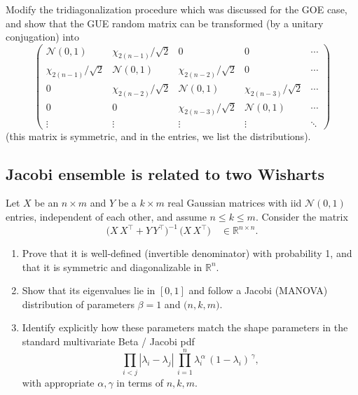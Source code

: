 \documentclass[letterpaper,11pt,oneside,reqno]{book}
\numberwithin{equation}{chapter}  %
\theoremstyle{definition}
\begin{document}
Modify the tridiagonalization procedure which was discussed
for the GOE case, and show that the
GUE random matrix can be transformed (by a unitary conjugation)
into
\begin{equation*}
	\begin{pmatrix}
		\mathcal{N}(0,1) & \chi_{2(n-1)}/\sqrt{2} & 0 & 0 & \cdots \\
		\chi_{2(n-1)}/\sqrt{2} & \mathcal{N}(0,1) & \chi_{2(n-2)}/\sqrt{2} & 0 & \cdots \\
		0 & \chi_{2(n-2)}/\sqrt{2} & \mathcal{N}(0,1) & \chi_{2(n-3)}/\sqrt{2} & \cdots \\
		0 & 0 & \chi_{2(n-3)}/\sqrt{2} & \mathcal{N}(0,1) & \cdots \\
		\vdots & \vdots & \vdots & \vdots & \ddots
	\end{pmatrix}
\end{equation*}
(this matrix is symmetric, and in the entries, we list the
distributions).






\subsection{Jacobi ensemble is related to two Wisharts}
\label{lecture3:prob:jacobi-two-wisharts}

Let \(X\) be an \(n\times m\) and \(Y\) be a \(k\times m\) real Gaussian matrices with iid \(\mathcal{N}(0,1)\) entries, independent of each other, and assume \(n \le k \le m\). Consider the matrix
\[
  \bigl(X\,X^\top + Y\,Y^\top \bigr)^{-1}\,
  \bigl(X\,X^\top \bigr)
  \quad \in \mathbb{R}^{n\times n}.
\]
\begin{enumerate}
  \item Prove that it is well-defined (invertible denominator) with probability 1, and that it is symmetric and diagonalizable in \(\mathbb{R}^n\).
  \item Show that its eigenvalues lie in \([0,1]\) and follow a Jacobi (MANOVA) distribution of parameters \(\beta=1\) and \(\bigl(n,k,m\bigr)\).
  \item Identify explicitly how these parameters match the shape parameters in the standard multivariate Beta / Jacobi pdf
  \[
     \prod_{i<j} |\lambda_i - \lambda_j| \,\prod_{i=1}^n
     \lambda_i^{\,\alpha}\,(1-\lambda_i)^{\,\gamma},
  \]
  with appropriate \(\alpha,\gamma\) in terms of \(n,k,m\).
\end{enumerate}
\end{document}
